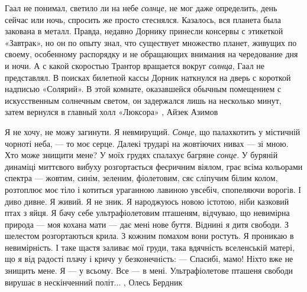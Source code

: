 Гаал не понимал, светило ли на небе \emph{солнце}, не мог даже определить, день сейчас
или ночь, спросить же просто стеснялся. Казалось, вся планета была закована в
металл. Правда, недавно Дорнику принесли консервы с этикеткой «Завтрак», но он
по опыту знал, что существует множество планет, живущих по своему, особенному
распорядку и не обращающих внимания на чередование дня и ночи. А с какой
скоростью Трантор вращается вокруг \emph{солнца}, Гаал не представлял.
В поисках билетной кассы Дорник наткнулся на дверь с короткой надписью
«Солярий». В этой комнате, оказавшейся обычным помещением с искусственным
солнечным светом, он задержался лишь на несколько минут, затем вернулся в
главный холл «Люксора»
, Айзек Азимов


Я не хочу, не можу загинути. Я невмирущий. \emph{Сонце}, що палахкотить у
містичній чорноті неба, — то моє серце. Далекі трударі на жовтіючих нивах — зі
мною. Хто може знищити мене?  У моїх грудях спалахує багряне \emph{сонце}. У
буряній динаміці миттєвого вибуху розгортається феєричним віялом, грає всіма
кольорами спектра — жовтим, синім, зеленим, фіолетовим, сяє сліпучим білим
колом, розтоплює моє тіло і котиться ураганною лавиною увсебіч, спопеляючи
ворогів.  І диво дивне. Я живий. Я не зник. Я народжуюсь новою істотою, ніби
казковий птах з яйця. Я бачу себе ультрафіолетовим пташеням, відчуваю, що
невимірна природа — моя кохана мати — дає мені нове буття. Віднині я дитя
свободи.  З шелестом розгортаються крила. З кожним помахом вони ростуть. Я
проникаю в невимірність. І таке щастя заливає мої груди, така вдячність
вселенській матері, що я від радості плачу і кричу у безконечність: — Спасибі,
мамо!  Ніхто вже не знищить мене. Я — у всьому. Все — в мені. Ультрафіолетове
пташеня свободи вирушає в нескінченний політ...
, Олесь Бердник

